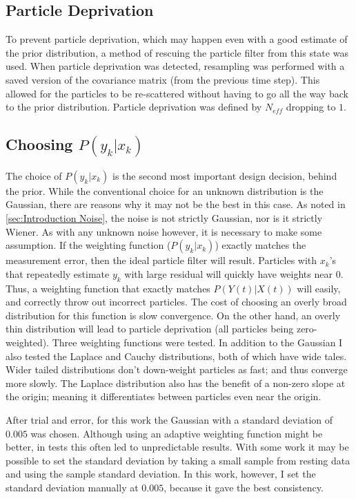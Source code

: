 \subsection{Particle Deprivation}
\label{sec:Particle Deprivation}
To prevent particle deprivation, which may happen even with a good
estimate of the prior distribution, a method of rescuing the particle
filter from this state was used. When particle deprivation was detected,
resampling was performed with a saved version of the covariance matrix (from
the previous time step). This allowed for the particles to be re-scattered
without having to go all the way back to the prior distribution. Particle 
deprivation was defined by $N_{eff}$ dropping to $1$.

\subsection{Choosing $P(y_k | x_k)$}
\label{sec:Methods Weighting Function}
The choice of $P(y_k | x_k)$ is the second most important design decision, behind 
the prior. While the conventional choice for an unknown distribution is the 
Gaussian, there are reasons why it may not be the best in this case.  
As noted in \autoref{sec:Introduction Noise}, the noise is not strictly Gaussian,
nor is it strictly Wiener. As with any unknown noise however, it is necessary 
to make some assumption. If the weighting function ($P(y_k | x_k)$) exactly
matches the measurement error, then the ideal particle filter will result.
Particles with $x_k$'s that repeatedly estimate $y_k$ with large residual 
will quickly have weights near 0. Thus, a weighting function that
exactly matches $P(Y(t) | X(t))$ will easily, and correctly throw out incorrect
particles.  The cost of choosing an overly broad distribution for this
function is slow convergence.  On the other hand, an overly thin 
distribution will lead to particle deprivation (all particles
being zero-weighted). Three weighting functions were 
tested. In addition to the Gaussian I also tested the Laplace and Cauchy
distributions, both of which have wide tales. 
Wider tailed distributions don't down-weight
particles as fast; and thus converge more slowly. 
The Laplace distribution also has the
benefit of a non-zero slope at the origin; meaning it 
differentiates between particles even near the origin.

After trial and error, for this work the Gaussian with a standard deviation 
of $0.005$ was chosen. Although using an adaptive weighting function
might be better, in tests this often led to unpredictable results. 
With some work it may be possible to set the standard deviation by
taking a small sample from resting data and using the sample standard deviation.
In this work, however, I set the standard deviation manually at $0.005$,
because it gave the best consistency. 

